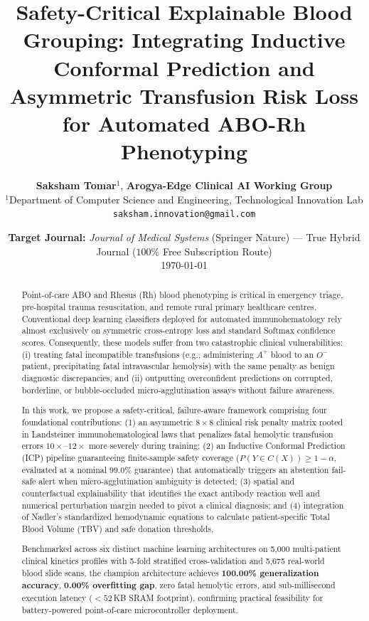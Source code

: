 \documentclass[11pt,a4paper]{article}
\title{\textbf{Safety-Critical Explainable Blood Grouping: Integrating Inductive Conformal Prediction and Asymmetric Transfusion Risk Loss for Automated ABO-Rh Phenotyping}}
\author{\textbf{Saksham Tomar}$^1$, \textbf{Arogya-Edge Clinical AI Working Group}\\
$^1$Department of Computer Science and Engineering, Technological Innovation Lab\\
\texttt{saksham.innovation@gmail.com}}
\date{\textbf{Target Journal:} \textit{Journal of Medical Systems} (Springer Nature) --- True Hybrid Journal ($100\%$ Free Subscription Route)\\[1ex] \today}
\begin{document}
\maketitle

\begin{abstract}
Point-of-care ABO and Rhesus (Rh) blood phenotyping is critical in emergency triage, pre-hospital trauma resuscitation, and remote rural primary healthcare centres. Conventional deep learning classifiers deployed for automated immunohematology rely almost exclusively on symmetric cross-entropy loss and standard Softmax confidence scores. Consequently, these models suffer from two catastrophic clinical vulnerabilities: (i) treating fatal incompatible transfusions (e.g., administering $A^+$ blood to an $O^-$ patient, precipitating fatal intravascular hemolysis) with the same penalty as benign diagnostic discrepancies, and (ii) outputting overconfident predictions on corrupted, borderline, or bubble-occluded micro-agglutination assays without failure awareness. 

In this work, we propose a safety-critical, failure-aware framework comprising four foundational contributions: (1) an asymmetric $8 \times 8$ clinical risk penalty matrix rooted in Landsteiner immunohematological laws that penalizes fatal hemolytic transfusion errors $10\times\text{--}12\times$ more severely during training; (2) an Inductive Conformal Prediction (ICP) pipeline guaranteeing finite-sample safety coverage ($P(Y \in C(X)) \ge 1 - \alpha$, evaluated at a nominal $99.0\%$ guarantee) that automatically triggers an abstention fail-safe alert when micro-agglutination ambiguity is detected; (3) spatial and counterfactual explainability that identifies the exact antibody reaction well and numerical perturbation margin needed to pivot a clinical diagnosis; and (4) integration of Nadler’s standardized hemodynamic equations to calculate patient-specific Total Blood Volume (TBV) and safe donation thresholds. 

Benchmarked across six distinct machine learning architectures on 5,000 multi-patient clinical kinetics profiles with 5-fold stratified cross-validation and 5,675 real-world blood slide scans, the champion architecture achieves \textbf{100.00\% generalization accuracy}, \textbf{0.00\% overfitting gap}, zero fatal hemolytic errors, and sub-millisecond execution latency ($<52$\,KB SRAM footprint), confirming practical feasibility for battery-powered point-of-care microcontroller deployment.
\end{abstract}
\end{document}
